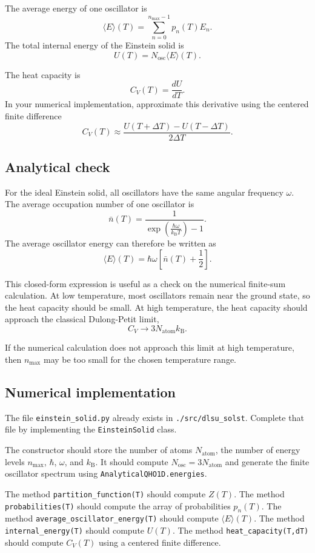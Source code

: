 The average energy of one oscillator is
\[
\langle E\rangle(T)=\sum_{n=0}^{n_{\max}-1}p_n(T)E_n.
\]
The total internal energy of the Einstein solid is
\[
U(T)=N_{\mathrm{osc}}\langle E\rangle(T).
\]

The heat capacity is
\[
C_V(T)=\frac{dU}{dT}.
\]
In your numerical implementation, approximate this derivative using the centered finite difference
\[
C_V(T)\approx
\frac{U(T+\Delta T)-U(T-\Delta T)}{2\Delta T}.
\]

\subsection{Analytical check}

For the ideal Einstein solid, all oscillators have the same angular frequency \(\omega\). The average occupation number of one oscillator is
\[
\bar n(T)=
\frac{1}{
\exp\left(\frac{\hbar\omega}{k_{\mathrm B}T}\right)-1
}.
\]
The average oscillator energy can therefore be written as
\[
\langle E\rangle(T)=\hbar\omega\left[\bar n(T)+\frac12\right].
\]

This closed-form expression is useful as a check on the numerical finite-sum calculation. At low temperature, most oscillators remain near the ground state, so the heat capacity should be small. At high temperature, the heat capacity should approach the classical Dulong-Petit limit,
\[
C_V\rightarrow3N_{\mathrm{atom}}k_{\mathrm B}.
\]

If the numerical calculation does not approach this limit at high temperature, then \(n_{\max}\) may be too small for the chosen temperature range.

\subsection{Numerical implementation}

The file \texttt{einstein\_solid.py} already exists in \texttt{./src/dlsu\_solst}. Complete that file by implementing the \texttt{EinsteinSolid} class.

The constructor should store the number of atoms \(N_{\mathrm{atom}}\), the number of energy levels \(n_{\max}\), \(\hbar\), \(\omega\), and \(k_{\mathrm B}\). It should compute \(N_{\mathrm{osc}}=3N_{\mathrm{atom}}\) and generate the finite oscillator spectrum using \texttt{AnalyticalQHO1D.energies}.

The method \texttt{partition\_function(T)} should compute \(Z(T)\). The method \texttt{probabilities(T)} should compute the array of probabilities \(p_n(T)\). The method \texttt{average\_oscillator\_energy(T)} should compute \(\langle E\rangle(T)\). The method \texttt{internal\_energy(T)} should compute \(U(T)\). The method \texttt{heat\_capacity(T,dT)} should compute \(C_V(T)\) using a centered finite difference.

